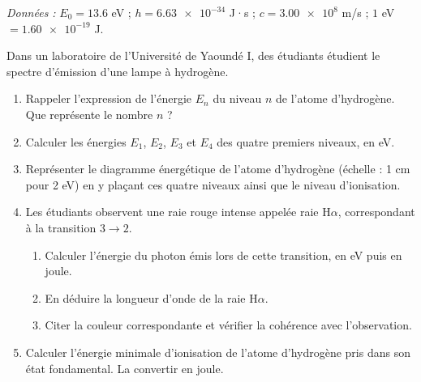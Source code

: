 \documentclass[11pt]{article}
\begin{document}
\begin{exercice}
\textit{Données :} $E_0 = \num{13,6}$ eV ; $h = \num{6,63e-34}$ J·s ; $c = \num{3,00e8}$ m/s ; $\num{1}$ eV $= \num{1,60e-19}$ J.

Dans un laboratoire de l'Université de Yaoundé I, des étudiants étudient le spectre d'émission d'une lampe à hydrogène.
\begin{enumerate}
\item Rappeler l'expression de l'énergie $E_n$ du niveau $n$ de l'atome d'hydrogène. Que représente le nombre $n$ ?
\item Calculer les énergies $E_1$, $E_2$, $E_3$ et $E_4$ des quatre premiers niveaux, en eV.
\item Représenter le diagramme énergétique de l'atome d'hydrogène (échelle : 1 cm pour 2 eV) en y plaçant ces quatre niveaux ainsi que le niveau d'ionisation.
\item Les étudiants observent une raie rouge intense appelée raie H$\alpha$, correspondant à la transition $3 \rightarrow 2$.
\begin{enumerate}
\item Calculer l'énergie du photon émis lors de cette transition, en eV puis en joule.
\item En déduire la longueur d'onde de la raie H$\alpha$.
\item Citer la couleur correspondante et vérifier la cohérence avec l'observation.
\end{enumerate}
\item Calculer l'énergie minimale d'ionisation de l'atome d'hydrogène pris dans son état fondamental. La convertir en joule.
\end{enumerate}
\end{exercice}
\end{document}
